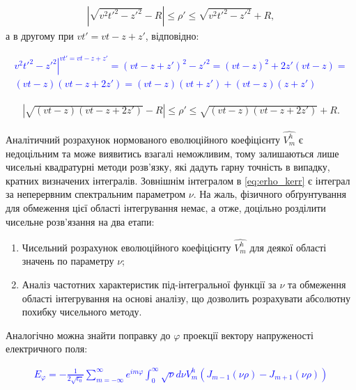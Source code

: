 \begin{equation} \begin{aligned}
\left| \sqrt{v^2t'^2 - z'^2} - R \right| \leq \rho' \leq 
\sqrt{v^2t'^2 - z'^2} + R,
\end{aligned} \end{equation}
%
а в другому при $ vt' = vt - z + z' $, відповідно:

\textcolor{blue} { \begin{equation*} \begin{aligned}
\left. v^2 t'^2 - z'^2 \right|^{vt' = vt - z + z'} = 
(vt - z + z')^2 - z'^2 = (vt - z)^2 + 2 z' (vt - z) = \\
(vt - z) (vt - z + 2 z') = (vt - z) (vt + z') + (vt - z) (z + z')
\end{aligned} \end{equation*} }

\begin{equation} \begin{aligned}
\left| \sqrt{(vt - z) (vt - z + 2 z')} - R \right| \leq \rho' \leq 
\sqrt{(vt - z) (vt - z + 2 z')} + R.
\end{aligned} \end{equation}

Аналітичний розрахунок нормованого еволюційного коефіцієнту $ \hat{V_m^h} $
є недоцільним та може виявитись взагалі неможливим, тому залишаються лише
чисельні квадратурні методи розв'язку, які дадуть гарну точність в випадку,
кратних визначених інтегралів. Зовнішнім інтегралом в \eqref{eq:erho_kerr} є 
інтеграл за неперервним спектральним параметром $ \nu $. На жаль, фізичного
обґрунтування для обмеження цієї області інтегрування немає, а отже,
доцільно розділити чисельне розв'язання на два етапи:

\begin{enumerate}
	\item Чисельний розрахунок еволюційного коефіцієнту $ \hat{V_m^h} $ 
	для деякої області значень по параметру $ \nu $;
	\item Аналіз частотних характеристик під-інтегральної функції за $ \nu $ 
	та обмеження області інтегрування на основі аналізу, що дозволить 
	розрахувати абсолютну похибку чисельного методу.
\end{enumerate}

Аналогічно можна знайти поправку до $ \varphi $ проекції вектору 
напруженості електричного поля:

\textcolor{blue} { \begin{equation*} \begin{aligned}
E_\varphi = - \frac{1}{2 \sqrt{\epsilon_0}} \sum_{m=-\infty}^{\infty} 
e^{im\varphi} \int_{0}^{\infty} \sqrt{\nu} d \nu 
V_m^h \left( J_{m-1} (\nu \rho) - J_{m+1} (\nu \rho) \right)
\end{aligned} \end{equation*} }

